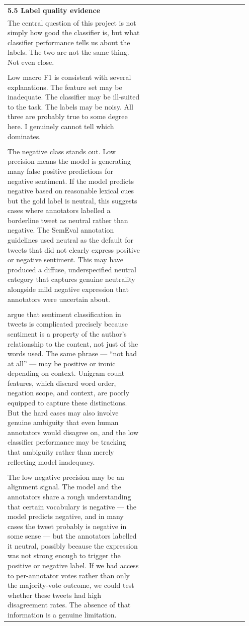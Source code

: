 \documentclass[11pt]{article}
\begin{document}
\begin{longtable}{|p{0.55\linewidth}|p{0.40\linewidth}|}
\hline
\rule{0pt}{3.5cm} & \\
\hline
\multicolumn{2}{|l|}{\textbf{5.5 Label quality evidence}} \\[2pt]
\hline
The central question of this project is not simply how good the classifier is, but what classifier performance tells us about the labels. The two are not the same thing. Not even close. & \\[2pt]
\hline
\rule{0pt}{3.5cm} & \\
\hline
Low macro F1 is consistent with several explanations. The feature set may be inadequate. The classifier may be ill-suited to the task. The labels may be noisy. All three are probably true to some degree here. I genuinely cannot tell which dominates. & \\[2pt]
\hline
\rule{0pt}{3.5cm} & \\
\hline
The negative class stands out. Low precision means the model is generating many false positive predictions for negative sentiment. If the model predicts negative based on reasonable lexical cues but the gold label is neutral, this suggests cases where annotators labelled a borderline tweet as neutral rather than negative. The SemEval annotation guidelines used neutral as the default for tweets that did not clearly express positive or negative sentiment. This may have produced a diffuse, underspecified neutral category that captures genuine neutrality alongside mild negative expression that annotators were uncertain about. & \\[2pt]
\hline
\rule{0pt}{3.5cm} & \\
\hline
argue that sentiment classification in tweets is complicated precisely because sentiment is a property of the author's relationship to the content, not just of the words used. The same phrase --- ``not bad at all'' --- may be positive or ironic depending on context. Unigram count features, which discard word order, negation scope, and context, are poorly equipped to capture these distinctions. But the hard cases may also involve genuine ambiguity that even human annotators would disagree on, and the low classifier performance may be tracking that ambiguity rather than merely reflecting model inadequacy. & \\[2pt]
\hline
\rule{0pt}{3.5cm} & \\
\hline
The low negative precision may be an alignment signal. The model and the annotators share a rough understanding that certain vocabulary is negative --- the model predicts negative, and in many cases the tweet probably is negative in some sense --- but the annotators labelled it neutral, possibly because the expression was not strong enough to trigger the positive or negative label. If we had access to per-annotator votes rather than only the majority-vote outcome, we could test whether these tweets had high disagreement rates. The absence of that information is a genuine limitation. & \\[2pt]

\end{longtable}
\end{document}
